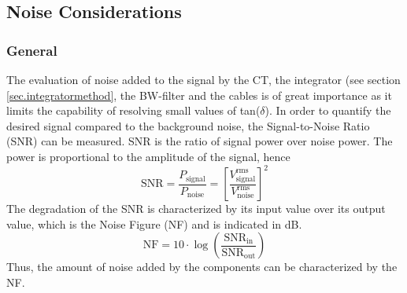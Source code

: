 \subsection{Noise Considerations}
\subsubsection{General}
The evaluation of noise added to the signal by the CT, the integrator (see section \ref{sec.integratormethod}, the BW-filter and the cables is of great importance as it limits the capability of resolving small values of tan($\delta$).
In order to quantify the desired signal compared to the background noise, the Signal-to-Noise Ratio (SNR)  can be measured. SNR is  the ratio of signal power over noise power. The power is proportional to the amplitude of the signal, hence 
\begin{equation}
	\textrm{SNR}=\frac{P_{\textrm{signal}}}{P_{\textrm{noise}}} = \left[\frac{V_{\textrm{signal}}^{\textrm{rms}}}{V_{\textrm{noise}}^{\textrm{rms}}}\right]^2
\end{equation}
The degradation of the SNR is characterized by its input value over its output value, which is the Noise Figure (NF) and is indicated in dB.
\begin{equation}
	\textrm{NF} = 10\cdot \log\left(\frac{\textrm{SNR}_{\textrm{in}}}{\textrm{SNR}_{\textrm{out}}}\right)
\end{equation}
Thus, the amount of noise added by the components can be characterized by the NF. 


